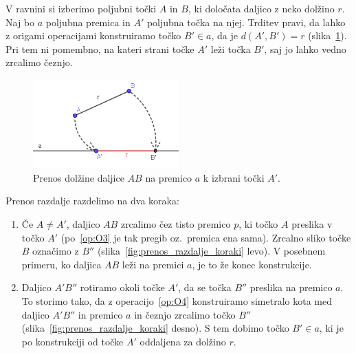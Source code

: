 \begin{dokaz}
    V ravnini si izberimo poljubni točki $A$ in $B$, ki določata daljico z neko dolžino $r$. Naj bo $a$ poljubna premica in $A'$ poljubna točka na njej. Trditev pravi, da lahko z origami operacijami konstruiramo točko $B' \in a$, da je $d(A', B') =r$ (slika~\ref{fig:prenos_razdalje_konec}). Pri tem ni pomembno, na kateri strani točke $A'$ leži točka $B'$, saj jo lahko vedno zrcalimo čeznjo.

    \begin{figure}[h]
        \centering
        \includegraphics[width=0.5\textwidth]{images/zrcaljenje_konec.png}
        \caption[Prenašanje razdalj z origamijem]{Prenos dolžine daljice $AB$ na premico $a$ k izbrani točki $A'$.}
        \label{fig:prenos_razdalje_konec}
    \end{figure}
    
    Prenos razdalje razdelimo na dva koraka:
    \begin{enumerate}
        \item Če $A \ne A'$, daljico $AB$ zrcalimo čez tisto premico $p$, ki točko $A$ preslika v točko $A'$ (po~\ref{op:O3} je tak pregib oz.\ premica ena sama). Zrcalno sliko točke $B$ označimo z $B''$ (slika~\ref{fig:prenos_razdalje_koraki} levo). V posebnem primeru, ko daljica $AB$ leži na premici $a$, je to že konec konstrukcije. 
        \item Daljico $A'B''$ rotiramo okoli točke $A'$, da se točka $B''$ preslika na premico $a$. To storimo tako, da z operacijo~\ref{op:O4} konstruiramo simetralo kota med daljico $A'B''$ in premico $a$ in čeznjo zrcalimo točko $B''$ (slika~\ref{fig:prenos_razdalje_koraki} desno). S tem dobimo točko $B' \in a$, ki je po konstrukciji od točke $A'$ oddaljena za dolžino $r$.
    \end{enumerate}


\end{dokaz}
